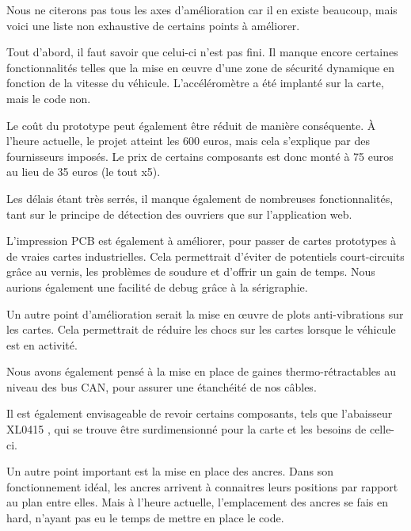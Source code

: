 Nous ne citerons pas tous les axes d'amélioration car il en existe beaucoup, mais voici
une liste non exhaustive de certains points à améliorer.
\bigskip

Tout d'abord, il faut savoir que celui-ci n'est pas fini. Il manque
encore certaines fonctionnalités telles que la mise en œuvre d'une zone de sécurité
dynamique en fonction de la vitesse du véhicule.
L'accéléromètre a été implanté sur la carte, mais le code non.

Le coût du prototype peut également être réduit de manière conséquente. À l'heure actuelle,
le projet atteint les 600 euros, mais cela s'explique par des fournisseurs imposés.
Le prix de certains composants est donc monté à 75 euros au lieu de 35 euros (le tout x5).

Les délais étant très serrés, il manque également de nombreuses fonctionnalités, tant sur le principe
de détection des ouvriers que sur l'application web. 

L'impression PCB est également à améliorer, pour passer de cartes prototypes à de vraies cartes industrielles.
Cela permettrait d'éviter de potentiels court-circuits grâce au vernis, les problèmes de soudure et d'offrir un gain de temps.
Nous aurions également une facilité de debug grâce à la sérigraphie.

Un autre point d'amélioration serait la mise en œuvre de plots anti-vibrations sur les cartes.
Cela permettrait de réduire les chocs sur les cartes lorsque le véhicule est en activité.

Nous avons également pensé à la mise en place de gaines thermo-rétractables au niveau des bus CAN,
pour assurer une étanchéité de nos câbles.

Il est également envisageable de revoir certains composants, tels que l'abaisseur XL0415 \cite{XL0415}, qui 
se trouve être surdimensionné pour la carte et les besoins de celle-ci.

Un autre point important est la mise en place des ancres. Dans son fonctionnement idéal,
les ancres arrivent à connaitres leurs positions par rapport au plan entre elles.
Mais à l'heure actuelle, l'emplacement des ancres se fais en hard, n'ayant pas eu le temps
de mettre en place le code. 

